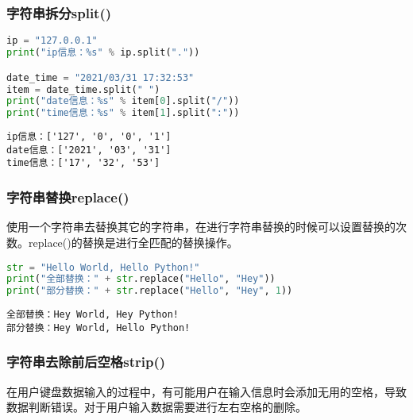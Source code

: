\subsubsection{字符串拆分split()}

\vspace{0.5cm}


\begin{lstlisting}[language=Python]
ip = "127.0.0.1"
print("ip信息：%s" % ip.split("."))

date_time = "2021/03/31 17:32:53"
item = date_time.split(" ")
print("date信息：%s" % item[0].split("/"))
print("time信息：%s" % item[1].split(":"))
\end{lstlisting}

\begin{tcolorbox}
	\begin{verbatim}
ip信息：['127', '0', '0', '1']
date信息：['2021', '03', '31']
time信息：['17', '32', '53']
\end{verbatim}
\end{tcolorbox}

\subsubsection{字符串替换replace()}

使用一个字符串去替换其它的字符串，在进行字符串替换的时候可以设置替换的次数。replace()的替换是进行全匹配的替换操作。\\


\begin{lstlisting}[language=Python]
str = "Hello World, Hello Python!"
print("全部替换：" + str.replace("Hello", "Hey"))
print("部分替换：" + str.replace("Hello", "Hey", 1))
\end{lstlisting}

\begin{tcolorbox}
	\begin{verbatim}
全部替换：Hey World, Hey Python!
部分替换：Hey World, Hello Python!
\end{verbatim}
\end{tcolorbox}

\subsubsection{字符串去除前后空格strip()}

在用户键盘数据输入的过程中，有可能用户在输入信息时会添加无用的空格，导致数据判断错误。对于用户输入数据需要进行左右空格的删除。
\newpage


